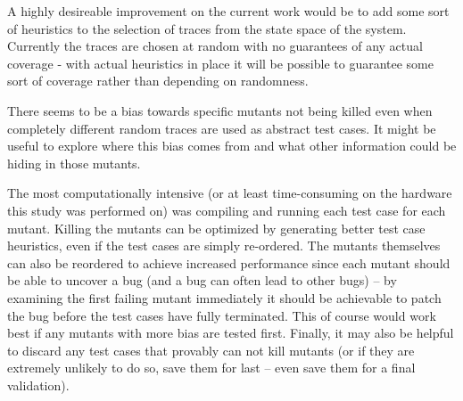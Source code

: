 \documentclass{article}
\begin{document}
		A highly desireable improvement on the current work would be to add some sort of heuristics to the selection of traces from the state space of the system. Currently the traces are chosen at random with no guarantees of any actual coverage \-- with actual heuristics in place it will be possible to guarantee some sort of coverage rather than depending on randomness.

		There seems to be a bias towards specific mutants not being killed even when completely different random traces are used as abstract test cases. It might be useful to explore where this bias comes from and what other information could be hiding in those mutants.

		The most computationally intensive (or at least time-consuming on the hardware this study was performed on) was compiling and running each test case for each mutant. Killing the mutants can be optimized by generating better test case heuristics, even if the test cases are simply re-ordered. The mutants themselves can also be reordered to achieve increased performance since each mutant should be able to uncover a bug (and a bug can often lead to other bugs) -- by examining the first failing mutant immediately it should be achievable to patch the bug before the test cases have fully terminated. This of course would work best if any mutants with more bias are tested first. Finally, it may also be helpful to discard any test cases that provably can not kill mutants (or if they are extremely unlikely to do so, save them for last -- even save them for a final validation).

\newpage

\end{document}

